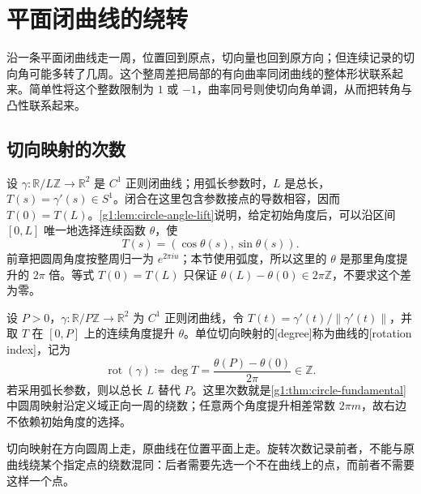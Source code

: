 
% 
% 

\section{平面闭曲线的绕转}
\label{g1:sec:0703}

沿一条平面闭曲线走一周，位置回到原点，切向量也回到原方向；但连续记录的切向角可能多转了几周。这个整周差把局部的有向曲率同闭曲线的整体形状联系起来。简单性将这个整数限制为 \(1\) 或 \(-1\)，曲率同号则使切向角单调，从而把转角与凸性联系起来。

\subsection{切向映射的次数}
\label{g1:subsec:0703:01}

设 \(\gamma:\mathbb R/L\mathbb Z\rightarrow\mathbb R^2\) 是 \(C^1\) 正则闭曲线；用弧长参数时，\(L\) 是总长，\(T(s)=\gamma'(s)\in S^1\)。闭合在这里包含参数接点的导数相容，因而 \(T(0)=T(L)\)。\cref{g1:lem:circle-angle-lift}说明，给定初始角度后，可以沿区间 \([0,L]\) 唯一地选择连续函数 \(\theta\)，使
\[
	T(s)=(\cos\theta(s),\sin\theta(s)).
\]
前章把圆周角度按整周归一为 \(e^{2\pi iu}\)；本节使用弧度，所以这里的 \(\theta\) 是那里角度提升的 \(2\pi\) 倍。等式 \(T(0)=T(L)\) 只保证 \(\theta(L)-\theta(0)\in2\pi\mathbb Z\)，不要求这个差为零。

\begin{definition}\label{g1:def:rotation-index}
	设 \(P>0\)，\(\gamma:\mathbb R/P\mathbb Z\to\mathbb R^2\) 为 \(C^1\) 正则闭曲线，令 \(T(t)=\gamma'(t)/\|\gamma'(t)\|\)，并取 \(T\) 在 \([0,P]\) 上的连续角度提升 \(\theta\)。单位切向映射的[degree]称为曲线的[rotation index]，记为
	\[
		\operatorname{rot}(\gamma)\coloneqq\deg T
		=\frac{\theta(P)-\theta(0)}{2\pi}\in\mathbb Z.
	\]
	若采用弧长参数，则以总长 \(L\) 替代 \(P\)。这里次数就是\cref{g1:thm:circle-fundamental}中圆周映射沿定义域正向一周的绕数；任意两个角度提升相差常数 \(2\pi m\)，故右边不依赖初始角度的选择。
\end{definition}

切向映射在方向圆周上走，原曲线在位置平面上走。旋转次数记录前者，不能与原曲线绕某个指定点的绕数混同：后者需要先选一个不在曲线上的点，而前者不需要这样一个点。


